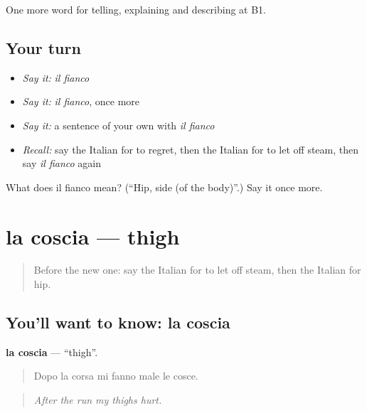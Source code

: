 \begin{grammarlens}[title={What you've built}]
One more word for telling, explaining and describing at B1.
\end{grammarlens}

\subsection*{Your turn}
\begin{itemize}
\raggedright
  \item \emph{Say it:} \emph{il fianco}
  \item \emph{Say it:} \emph{il fianco}, once more
  \item \emph{Say it:} a sentence of your own with \emph{il fianco}
  \item \emph{Recall:} say the Italian for to regret, then the Italian for to let off steam, then say \emph{il fianco} again
\end{itemize}

\begin{tcolorbox}[breakable,colback=teal!4,colframe=teal!35!black,title={Before you move on}]
What does il fianco mean? (\textquotedblleft{}Hip, side (of the body)\textquotedblright{}.) Say it once more.
\end{tcolorbox}
\section[la coscia]{la coscia — thigh}

\label{lesson:IT-C481-coscia}



\begin{quote}
Before the new one: say the Italian for to let off steam, then the Italian for hip.
\end{quote}

\subsection*{You'll want to know: la coscia}
\textbf{la coscia} — \textquotedblleft{}thigh\textquotedblright{}.

\begin{quote}
Dopo la corsa mi fanno male le cosce.
\end{quote}

\begin{quote}
\emph{After the run my thighs hurt.}
\end{quote}

